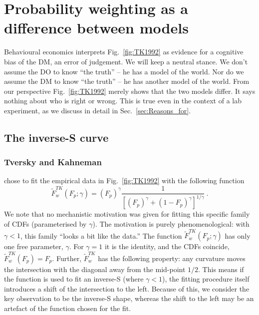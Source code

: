 \documentclass[a4paper, 12pt]{article}
\newcommand{\elabel}[1]{\label{eq:#1}}
\newcommand{\Eref}[1]{Equation~(\ref{eq:#1})}
\newcommand{\fref}[1]{Fig.~\ref{fig:#1}}
\newcommand{\seclabel}[1]{\label{sec:#1}}
\newcommand{\secref}[1]{Sec.~\ref{sec:#1}}
\newcommand{\be}{\begin{equation}}
\newcommand{\ee}{\end{equation}}
\newcommand{\OP}[1]{{\it ***OP: #1 OP***}}
\begin{document}


\section{Probability weighting as a difference between models} \seclabel{ModelDiff}

Behavioural economics interprets \fref{TK1992} as evidence for a cognitive bias of the DM, an error of judgement. We will keep a neutral stance. We don't assume the DO to know ``the truth'' -- he has a model of the world. Nor do we assume the DM to know ``the truth'' -- he has another model of the world. From our perspective \fref{TK1992} merely shows that the two models differ. It says nothing about who is right or wrong. This is true even in the context of a lab experiment, as we discuss in detail in \secref{Reasons_for}.

\subsection{The inverse-S curve\seclabel{The_inverse}}
\subsubsection{Tversky and Kahneman}
\citet{TverskyKahneman1992} chose to fit the empirical data in \fref{TK1992} with the following function
% 
\be
\elabel{correspondence}
\tilde{F}^{TK}_w\left(F_p; \gamma\right) = \left(F_p\right)^\gamma \frac{1}{\left[\left(F_p\right)^\gamma+\left(1-F_p\right)^\gamma\right]^{1/\gamma}} ~.
\ee
We note that no mechanistic motivation was given for fitting this specific family of CDFs (parameterised by $\gamma$). The motivation is purely phenomenological: with $\gamma<1$, this family ``looks a bit like the data.''
% 
The function $\tilde{F}^{TK}_w\left(F_p; \gamma \right)$ has only one free parameter, $\gamma$. For $\gamma=1$ it is the identity, and the CDFs coincide, $\tilde{F}^{TK}_w\left(F_p\right)=F_p$. Further, $\tilde{F}^{TK}_w$ has the following property: any curvature moves the intersection with the diagonal away from the mid-point $1/2$. This means if the function is used to fit an inverse-S (where $\gamma<1$), the fitting procedure itself introduces a shift of the intersection to the left. Because of this, we consider the key observation to be the inverse-S shape, whereas the shift to the left may be an artefact of the function chosen for the fit. 
\end{document}
